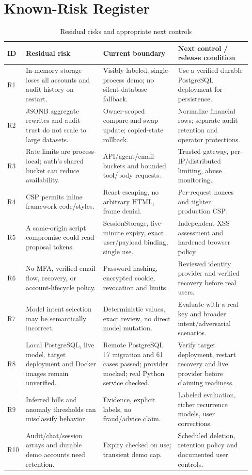 \documentclass[conference,a4paper]{IEEEtran}
\begin{document}
\section{Known-Risk Register}
\begin{table}[t]
\caption{Residual risks and appropriate next controls}
\centering\small
\begin{tabular}{L{13mm}L{54mm}L{54mm}L{43mm}}
\toprule ID & Residual risk & Current boundary & Next control / release condition\\\midrule
R1 & In-memory storage loses all accounts and audit history on restart. & Visibly labeled, single-process demo; no silent database fallback. & Use a verified durable PostgreSQL deployment for persistence.\\
R2 & JSONB aggregate rewrites and audit trust do not scale to large datasets. & Owner-scoped compare-and-swap update; copied-state rollback. & Normalize financial rows; separate audit retention and operator protections.\\
R3 & Rate limits are process-local; auth's shared bucket can reduce availability. & API/agent/email buckets and bounded tool/body requests. & Trusted gateway, per-IP/distributed limiting, abuse monitoring.\\
R4 & CSP permits inline framework code/styles. & React escaping, no arbitrary HTML, frame denial. & Per-request nonces and tighter production CSP.\\
R5 & A same-origin script compromise could read proposal tokens. & SessionStorage, five-minute expiry, exact user/payload binding, single use. & Independent XSS assessment and hardened browser policy.\\
R6 & No MFA, verified-email flow, recovery, or account-lifecycle policy. & Password hashing, encrypted cookie, revocation and limits. & Reviewed identity provider and verified recovery before real users.\\
R7 & Model intent selection may be semantically incorrect. & Deterministic values, exact review, no direct model mutation. & Evaluate with a real key and broader intent/adversarial scenarios.\\
R8 & Local PostgreSQL, live model, target deployment and Docker images remain unverified. & Remote PostgreSQL 17 migration and 61 cases passed; provider mocked; real Python service checked. & Verify target deployment, restart recovery and live provider before claiming readiness.\\
R9 & Inferred bills and anomaly thresholds can misclassify behavior. & Evidence, explicit labels, no fraud/advice claim. & Labeled evaluation, richer recurrence models, user corrections.\\
R10 & Audit/chat/session arrays and durable demo accounts need retention. & Expiry checked on use; transient demo cap. & Scheduled deletion, retention policy and documented user controls.\\
\bottomrule
\end{tabular}
\end{table}
\end{document}
